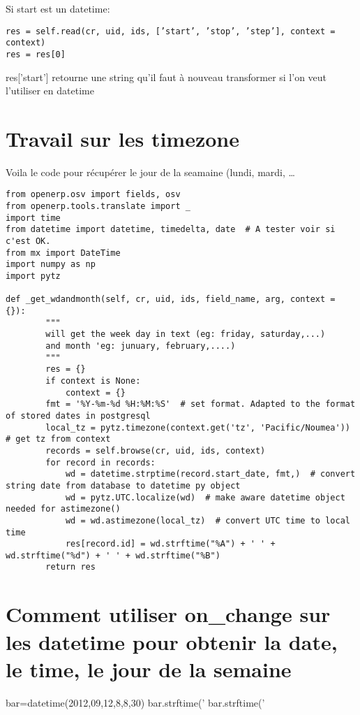 \documentclass[12pt,a4paper]{article}
\begin{document}
Si start est un datetime:

\begin{verbatim}
res = self.read(cr, uid, ids, [’start’, ’stop’, ’step’], context = context)
res = res[0]
\end{verbatim}

res['start'] retourne une string qu’il faut à nouveau transformer si l’on veut l’utiliser en datetime
\section{Travail sur les timezone}
\label{sec:timezone}

Voila le code pour récupérer le jour de la seamaine (lundi, mardi, \ldots
\begin{verbatim}
from openerp.osv import fields, osv
from openerp.tools.translate import _
import time
from datetime import datetime, timedelta, date  # A tester voir si c'est OK.
from mx import DateTime
import numpy as np
import pytz

def _get_wdandmonth(self, cr, uid, ids, field_name, arg, context = {}):
        """
        will get the week day in text (eg: friday, saturday,...)
        and month 'eg: junuary, february,....)
        """
        res = {}
        if context is None:
            context = {}
        fmt = '%Y-%m-%d %H:%M:%S'  # set format. Adapted to the format of stored dates in postgresql
        local_tz = pytz.timezone(context.get('tz', 'Pacific/Noumea'))  # get tz from context
        records = self.browse(cr, uid, ids, context)
        for record in records:
            wd = datetime.strptime(record.start_date, fmt,)  # convert string date from database to datetime py object
            wd = pytz.UTC.localize(wd)  # make aware datetime object needed for astimezone()
            wd = wd.astimezone(local_tz)  # convert UTC time to local time
            res[record.id] = wd.strftime("%A") + ' ' + wd.strftime("%d") + ' ' + wd.strftime("%B")
        return res
\end{verbatim}

\section{Comment utiliser on\_change sur les datetime pour obtenir la date, le time, le jour de la semaine}
\label{sec:onchangedate}



bar=datetime(2012,09,12,8,8,30)
bar.strftime(’%
bar.strftime(’%
\end{document}

